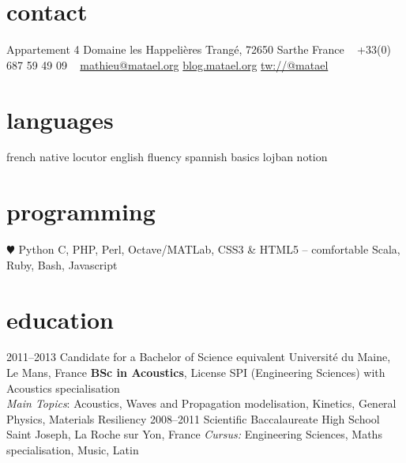 \documentclass[]{friggeri-cv} %
\begin{document}


\begin{aside} %
\section{contact}
Appartement 4
Domaine les Happelières
Trangé, 72650 Sarthe
France
~
+33(0) 687 59 49 09
~
\href{mailto:mathieu@matael.org}{mathieu@matael.org}
\href{http://blog.matael.org}{blog.matael.org}
\href{http://twitter.com/matael}{tw://@matael}
\section{languages}
french native locutor
english fluency
spannish basics
lojban notion
\section{programming}
{\color{red} $\varheartsuit$} Python
C, PHP, Perl, Octave/MATLab, CSS3 \& HTML5 -- comfortable
Scala, Ruby, Bash, Javascript
\end{aside}


\section{education}

\begin{entrylist}
\entry
{2011--2013}
{{\normalfont Candidate for a} Bachelor of Science {\normalfont equivalent}}
{Université du Maine, Le Mans, France}
{\textbf{BSc in Acoustics}, License SPI (Engineering Sciences) with Acoustics specialisation\\\emph{Main Topics}: Acoustics, Waves and Propagation
modelisation, Kinetics, General Physics, Materials Resiliency}
\entry
{2008--2011}
{Scientific Baccalaureate} 
{High School Saint Joseph, La Roche sur Yon, France}
{\emph{Cursus:} Engineering Sciences, Maths specialisation, Music, Latin}
\end{entrylist}
\end{document}
